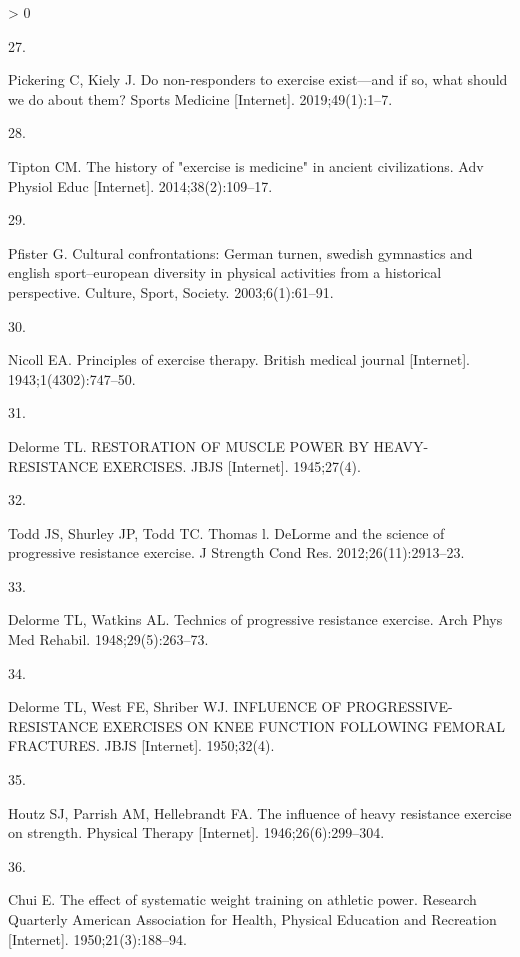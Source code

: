 \documentclass[twoside,10pt]{gihclass} %
\newlength{\cslhangindent}
\newlength{\csllabelwidth}
\newenvironment{CSLReferences}[3] %
 {%
  \setlength{\parindent}{0pt}
  \ifodd #1 \everypar{\setlength{\hangindent}{\cslhangindent}}\ignorespaces\fi
  \ifnum #2 > 0
  \setlength{\parskip}{#2\baselineskip}
  \fi
 }%
 {}
\newcommand{\CSLLeftMargin}[1]{\parbox[t]{\maxof{\widthof{#1}}{\csllabelwidth}}{#1}}
\newcommand{\CSLRightInline}[1]{\parbox[t]{\linewidth}{#1}}
\begin{document}
\begin{CSLReferences}{0}{0}
\leavevmode\hypertarget{ref-RN2547}{}%
\CSLLeftMargin{27. }
\CSLRightInline{Pickering C, Kiely J. Do non-responders to exercise exist---and if so, what should we do about them? Sports Medicine {[}Internet{]}. 2019;49(1):1--7. }

\leavevmode\hypertarget{ref-RN2640}{}%
\CSLLeftMargin{28. }
\CSLRightInline{Tipton CM. The history of "exercise is medicine" in ancient civilizations. Adv Physiol Educ {[}Internet{]}. 2014;38(2):109--17. }

\leavevmode\hypertarget{ref-RN2663}{}%
\CSLLeftMargin{29. }
\CSLRightInline{Pfister G. Cultural confrontations: German turnen, swedish gymnastics and english sport--european diversity in physical activities from a historical perspective. Culture, Sport, Society. 2003;6(1):61--91. }

\leavevmode\hypertarget{ref-RN2634}{}%
\CSLLeftMargin{30. }
\CSLRightInline{Nicoll EA. Principles of exercise therapy. British medical journal {[}Internet{]}. 1943;1(4302):747--50. }

\leavevmode\hypertarget{ref-RN2633}{}%
\CSLLeftMargin{31. }
\CSLRightInline{Delorme TL. RESTORATION OF MUSCLE POWER BY HEAVY-RESISTANCE EXERCISES. JBJS {[}Internet{]}. 1945;27(4). }

\leavevmode\hypertarget{ref-RN2639}{}%
\CSLLeftMargin{32. }
\CSLRightInline{Todd JS, Shurley JP, Todd TC. Thomas l. DeLorme and the science of progressive resistance exercise. J Strength Cond Res. 2012;26(11):2913--23. }

\leavevmode\hypertarget{ref-RN2641}{}%
\CSLLeftMargin{33. }
\CSLRightInline{Delorme TL, Watkins AL. Technics of progressive resistance exercise. Arch Phys Med Rehabil. 1948;29(5):263--73. }

\leavevmode\hypertarget{ref-RN2646}{}%
\CSLLeftMargin{34. }
\CSLRightInline{Delorme TL, West FE, Shriber WJ. INFLUENCE OF PROGRESSIVE-RESISTANCE EXERCISES ON KNEE FUNCTION FOLLOWING FEMORAL FRACTURES. JBJS {[}Internet{]}. 1950;32(4). }

\leavevmode\hypertarget{ref-RN2632}{}%
\CSLLeftMargin{35. }
\CSLRightInline{Houtz SJ, Parrish AM, Hellebrandt FA. The influence of heavy resistance exercise on strength. Physical Therapy {[}Internet{]}. 1946;26(6):299--304. }

\leavevmode\hypertarget{ref-RN2644}{}%
\CSLLeftMargin{36. }
\CSLRightInline{Chui E. The effect of systematic weight training on athletic power. Research Quarterly American Association for Health, Physical Education and Recreation {[}Internet{]}. 1950;21(3):188--94. }


\end{CSLReferences}
\end{document}
